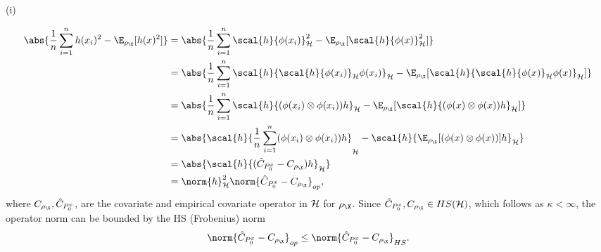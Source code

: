 \begin{description}
\item[{(i)}] 
\end{description}
\begin{align*}
  \abs{\frac{1}{n} \sum_{i=1}^nh(x_i)^2 - \E_{\rho_{\X}}[h(x)^2]} & = \abs{\frac{1}{n} \sum_{i=1}^n \scal{h}{\phi(x_i)}_{\rkhs{H}}^2  - \E_{\rho_{\X}}[\scal{ h}{ \phi(x) }_{\rkhs{H}}^2]} \\
                                                                  & = \abs{\frac{1}{n} \sum_{i=1}^n \scal{h}{\scal{h}{\phi(x_i)}_{\rkhs{H}} \phi(x_i)}_{\rkhs{H}}  - \E_{\rho_{\X}}[\scal{h}{\scal{h}{\phi(x)}_{\rkhs{H}}\phi(x)}_{\rkhs{H}}]} \\
                                                                  & = \abs{\frac{1}{n} \sum_{i=1}^n \scal{h}{(\phi(x_i) \otimes \phi(x_i)) h}_{\rkhs{H}} - \E_{\rho_{\X}}[\scal{h}{(\phi(x) \otimes \phi(x)) h}_{\rkhs{H}}]} \\
                                                                  & = \abs{\scal{h}{\frac{1}{n} \sum_{i=1}^n(\phi(x_i) \otimes \phi(x_i)) h}_{\rkhs{H}} - \scal{h}{\E_{\rho_{\X}}[(\phi(x) \otimes \phi(x))] h}_{\rkhs{H}}} \\
                                                                  & = \abs{\scal{h}{(\hat{C}_{\poolsetx_{0}} - C_{\rho_{\X}})h}_{\rkhs{H}}} \\
                                                                  & = \norm{h}_{\rkhs{H}}^2 \norm{\hat{C}_{\poolsetx_{0}} - C_{\rho_{\X}}}_{op},
\end{align*}         
where \(C_{\rho_{\X}}, \hat{C}_{\poolsetx_{0}}\), are the covariate and
empirical covariate operator in \(\mathcal{H}\) for \(\rho_{\X}\).
Since \(\hat{C}_{\poolsetx_{0}}, C_{\rho_{\X}} \in HS(\rkhs{H})\), which follows
as \(\kappa < \infty\), the operator norm can be bounded
by the HS (Frobenius) norm
\begin{equation}
  \label{eq:op_leq_HS}
  \norm{\hat{C}_{\poolsetx_{0}} - C_{\rho_{\X}}}_{op} \leq \norm{\hat{C}_{\poolsetx_{0}} - C_{\rho_{\X}}}_{HS}.
\end{equation}

